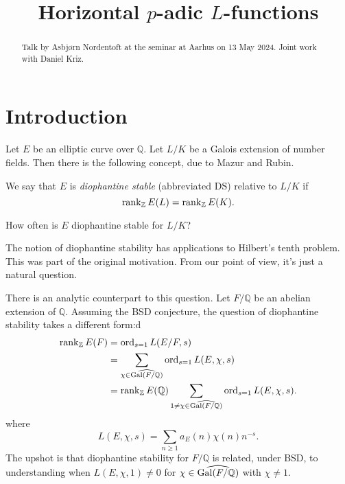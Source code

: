 \documentclass[reqno]{amsart} 
\begin{document}
\title{Horizontal $p$-adic $L$-functions}

\begin{abstract}
  Talk by Asbj{\o}rn Nordentoft at the seminar at Aarhus on 13 May 2024.  Joint work with Daniel Kriz.
\end{abstract}

\maketitle

\section{Introduction}
Let $E$ be an elliptic curve over $\mathbb{Q}$.  Let $L/K$ be a Galois extension of number fields.  Then there is the following concept, due to Mazur and Rubin.
\begin{definition}
  We say that $E$ is \emph{diophantine stable} (abbreviated $\mathrm{D S}$) relative to $L/K$ if
  \begin{equation*}
    \operatorname{rank}_{\mathbb{Z}} E(L) = \operatorname{rank}_{\mathbb{Z}} E(K).
  \end{equation*}
\end{definition}
\begin{question}
  How often is $E$ diophantine stable for $L/K$?
\end{question}
\begin{remark}
  The notion of diophantine stability has applications to Hilbert's tenth problem.  This was part of the original motivation.  From our point of view, it's just a natural question.
\end{remark}
There is an analytic counterpart to this question.  Let $F /\mathbb{Q}$ be an abelian extension of $\mathbb{Q}$.  Assuming the BSD conjecture, the question of diophantine stability takes a different form:d
\begin{align*}
  \operatorname{rank}_{\mathbb{Z}} E(F)
  &= \operatorname{ord}_{s = 1} L(E/F, s) \\
  &=
    \sum_{\chi \in \widehat{\operatorname{Gal}(F / \mathbb{Q})}}
    \operatorname{ord}_{s = 1} L(E, \chi, s) \\
  &=
    \operatorname{rank}_{\mathbb{Z}} E(\mathbb{Q})
    \sum_{1 \neq \chi \in \widehat{\operatorname{Gal}(F / \mathbb{Q})}}
    \operatorname{ord}_{s = 1} L(E, \chi, s).
\end{align*}
where
\begin{equation*}
  L(E, \chi, s) = \sum_{n \geq 1} a_E(n) \chi(n) n^{- s}.
\end{equation*}
The upshot is that diophantine stability for $F/\mathbb{Q}$ is related, under BSD, to understanding when $L(E, \chi, 1) \neq 0$ for $\chi \in \widehat{\operatorname{Gal}(F / \mathbb{Q})}$ with $\chi \neq 1$.
\end{document}
